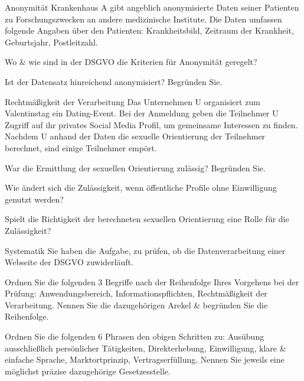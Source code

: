 \documentclass{exercisesheet}
\begin{document}
\begin{exercise*}{Anonymität}{
    Krankenhaus A gibt angeblich anonymisierte Daten seiner Patienten zu Forschungszwecken an andere medizinische Institute. Die Daten umfassen folgende Angaben über den Patienten: Krankheitsbild, Zeitraum der Krankheit, Geburtsjahr, Postleitzahl.
  }
  \item Wo \& wie sind in der DSGVO die Kriterien für Anonymität geregelt?
  \item Ist der Datensatz hinreichend anonymisiert? Begründen Sie.
\end{exercise*}

\begin{exercise*}{Rechtmäßigkeit der Verarbeitung}{
    Das Unternehmen U organisiert zum Valentinstag ein Dating-Event. Bei der Anmeldung geben die Teilnehmer U Zugriff auf ihr privates Social Media Profil, um gemeinsame Interessen zu finden. Nachdem U anhand der Daten die sexuelle Orientierung der Teilnehmer berechnet, sind einige Teilnehmer empört.
  }
  \item War die Ermittlung der sexuellen Orientierung zulässig? Begründen Sie.
  \item Wie ändert sich die Zulässigkeit, wenn öffentliche Profile ohne Einwilligung genutzt werden?
  \item Spielt die Richtigkeit der berechneten sexuellen Orientierung eine Rolle für die Zulässigkeit?
\end{exercise*}

\begin{exercise*}{Systematik}{
    Sie haben die Aufgabe, zu prüfen, ob die Datenverarbeitung einer Webseite der DSGVO zuwiderläuft.
  }
  \item Ordnen Sie die folgenden 3 Begriffe nach der Reihenfolge Ihres Vorgehens bei der Prüfung: Anwendungsbereich, Informationspflichten, Rechtmäßigkeit der Verarbeitung. Nennen Sie die dazugehörigen Arekel \& begründen Sie die Reihenfolge.
  \item Ordnen Sie die folgenden 6 Phrasen den obigen Schritten zu: Ausübung ausschließlich persönlicher Tätigkeiten, Direkterhebung, Einwilligung, klare \& einfache Sprache, Marktortprinzip, Vertragserfüllung. Nennen Sie jeweils eine möglichst präzise dazugehörige Gesetzesstelle.
\end{exercise*}
\end{document}
